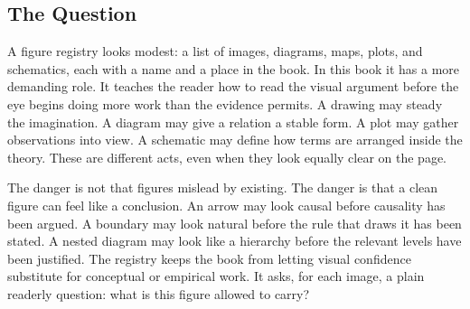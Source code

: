 \documentclass[11pt,a4paper,openany]{book}
\begin{document}
\subsection{The Question}
A figure registry looks modest: a list of images, diagrams, maps, plots, and schematics, each with a name and a place in the book. In this book it has a more demanding role. It teaches the reader how to read the visual argument before the eye begins doing more work than the evidence permits. A drawing may steady the imagination. A diagram may give a relation a stable form. A plot may gather observations into view. A schematic may define how terms are arranged inside the theory. These are different acts, even when they look equally clear on the page. \cite{kauffman_autocatalytic,raf_networks}\par
The danger is not that figures mislead by existing. The danger is that a clean figure can feel like a conclusion. An arrow may look causal before causality has been argued. A boundary may look natural before the rule that draws it has been stated. A nested diagram may look like a hierarchy before the relevant levels have been justified. The registry keeps the book from letting visual confidence substitute for conceptual or empirical work. It asks, for each image, a plain readerly question: what is this figure allowed to carry?\par
\end{document}
